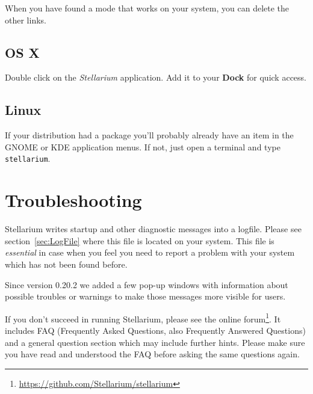 When you have found a mode that works on your system, you can delete
the other links.

\subsection{OS X}
\label{sec:GettingStarted:Running:MacOSX}

Double click on the \emph{Stellarium} application.  Add it to your
\textbf{Dock} for quick access.

\subsection{Linux}
\label{sec:GettingStarted:Running:Linux}

If your distribution had a package you'll probably already have an
item in the GNOME or KDE application menus. If not, just open a
terminal and type \texttt{stellarium}.


\section{Troubleshooting}
\label{sec:GettingStarted:Running:Troubleshooting}

Stellarium writes startup and other diagnostic messages into a
logfile. Please see section~\ref{sec:LogFile} where this
file is located on your system. This file is \emph{essential} in case when
you feel you need to report a problem with your system which has not
been found before.

Since version 0.20.2 we added a few pop-up windows with information about possible 
troubles or warnings to make those messages more visible for users.

If you don't succeed in running Stellarium, please see the online
forum\footnote{\url{https://github.com/Stellarium/stellarium}}.  It includes
FAQ (Frequently Asked Questions, also Frequently Answered
Questions) and a general question section which may include
further hints. Please make sure you have read and understood the FAQ
before asking the same questions again.


